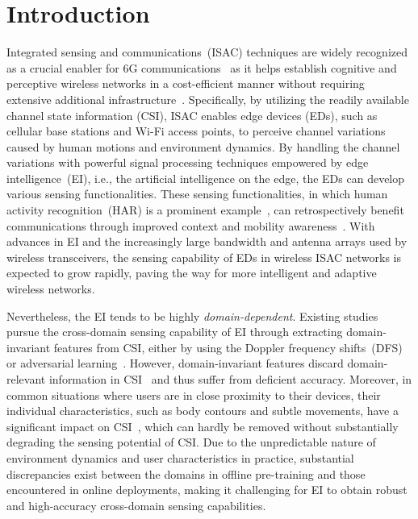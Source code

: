 \section[Introduction]{Introduction}
\label{sec: intro}

Integrated sensing and communications~(ISAC) techniques are widely recognized as a crucial enabler for 6G communications~\cite{Dong23TWC_Sensing} 
as it helps establish cognitive and perceptive wireless networks in a cost-efficient manner without requiring extensive additional infrastructure~\cite{Liu22JSAC_ISAC}.
Specifically, by utilizing the readily available channel state information (CSI), ISAC enables edge devices (EDs), such as cellular base stations and Wi-Fi access points, to perceive channel variations caused by human motions and environment dynamics.
By handling the channel variations with powerful signal processing techniques empowered by edge intelligence~(EI), i.e., the artificial intelligence on the edge, the EDs can develop various sensing functionalities.
These sensing functionalities, in which human activity recognition~(HAR) is a prominent example~\cite{Li23COMMAG_Integrated}, can retrospectively benefit communications through improved context and mobility awareness~\cite{Strinati24EuCNC_Distributed,Saleem21TWC_Mobility}.
With advances in EI and the increasingly large bandwidth and antenna arrays used by wireless transceivers, the sensing capability of EDs in wireless ISAC networks is expected to grow rapidly, paving the way for more intelligent and adaptive wireless networks.


Nevertheless, the EI tends to be highly \emph{domain-dependent}.
Existing studies pursue the cross-domain sensing capability of EI through extracting domain-invariant features from CSI, either by using the Doppler frequency shifts~(DFS)~\cite{Zhang21TPAMI_Widar3,Niu22TMC_Understand} or adversarial learning~\cite{Jiang18MobiCom_Sulu, Wang23TMC_AirFi, Li21IMWUT_CrossGR}.
However, domain-invariant features discard domain-relevant information in CSI~\cite{Bui21NIPS_Exploiting} and thus suffer from deficient accuracy.
Moreover, in common situations where users are in close proximity to their devices, their individual characteristics, such as body contours and subtle movements, have a significant impact on CSI~\cite{Hu2023Mobicom_Muse}, which can hardly be removed without substantially degrading the sensing potential of CSI.
Due to the unpredictable nature of environment dynamics and user characteristics in practice, substantial discrepancies exist between the domains in offline pre-training and those encountered in online deployments, making it challenging for EI to obtain robust and high-accuracy cross-domain sensing capabilities.

